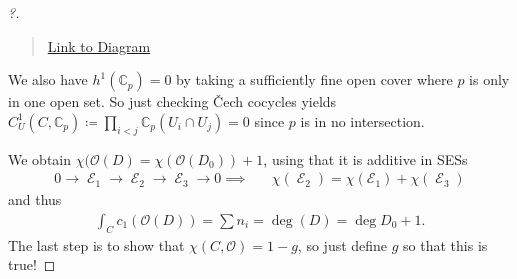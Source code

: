 \begin{proof}[?]
\begin{center}
\end{center}

\begin{quote}
\href{https://q.uiver.app/?q=WzAsOCxbMCwyLCJIXjAoIFxcT08oRF8wKSApIl0sWzIsMiwiSF4wKCBcXE9PKEQpICkiXSxbNCwyLCJIXjAoIFxcT08oXFxDQ19wKSApIl0sWzAsNCwiSF4xKCBcXE9PKERfMCkgKSJdLFsyLDQsIkheMSggXFxPTyhEKSApIl0sWzQsNCwiSF4xKCBcXE9PKFxcQ0NfcCkgKSA9IDAiXSxbNCwwLCIwIl0sWzAsNiwiMCJdLFsyLDNdLFswLDFdLFsxLDJdLFszLDRdLFs0LDVdLFs2LDBdLFs1LDddXQ==}{Link
to Diagram}
\end{quote}

We also have \(h^1({\mathbb{C}}_p) = 0\) by taking a sufficiently fine
open cover where \(p\) is only in one open set. So just checking Čech
cocycles yields
\(C_U^1(C, {\mathbb{C}}_p) \coloneqq\prod_{i<j} {\mathbb{C}}_p(U_i \cap U_j) = 0\)
since \(p\) is in no intersection.

\begin{figure}
\centering
{}
\end{figure}

We obtain \(\chi( {\mathcal{O}}(D) = \chi( {\mathcal{O}}(D_0) ) + 1\),
using that it is additive in SESs
\begin{align*}
0 \to 
\operatorname{\mathcal{E}}_1 \to
\operatorname{\mathcal{E}}_2 \to
\operatorname{\mathcal{E}}_3 \to
0
\implies && 
\chi(\operatorname{\mathcal{E}}_2) = \chi( \operatorname{\mathcal{E_1}}) + \chi( \operatorname{\mathcal{E}}_3 )
\end{align*}
and thus
\begin{align*}
\int_C c_1 ({\mathcal{O}}(D) ) = \sum n_i = \deg(D) = \deg D_0 + 1
.\end{align*}
The last step is to show that \(\chi(C, {\mathcal{O}}) = 1-g\), so just
define \(g\) so that this is true!

\end{proof}

